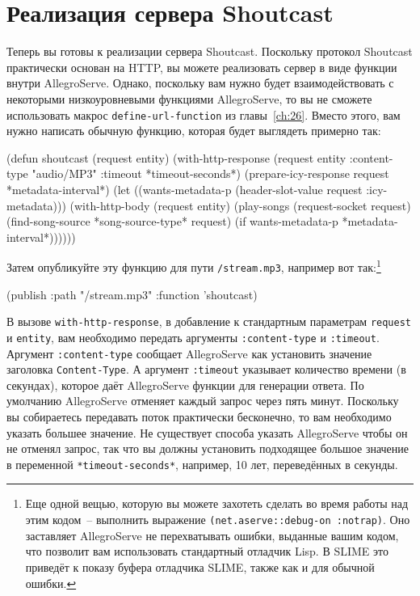 \section{Реализация сервера Shoutcast}

Теперь вы готовы к реализации сервера Shoutcast. Поскольку протокол Shoutcast практически
основан на HTTP, вы можете реализовать сервер в виде функции внутри AllegroServe.  Однако,
поскольку вам нужно будет взаимодействовать с некоторыми низкоуровневыми функциями
AllegroServe, то вы не сможете использовать макрос \lstinline{define-url-function} из
главы~\ref{ch:26}. Вместо этого, вам нужно написать обычную функцию, которая будет
выглядеть примерно так:

\begin{myverb}
(defun shoutcast (request entity)
  (with-http-response
      (request entity :content-type "audio/MP3" :timeout *timeout-seconds*)
    (prepare-icy-response request *metadata-interval*)
    (let ((wants-metadata-p (header-slot-value request :icy-metadata)))
      (with-http-body (request entity)
        (play-songs 
         (request-socket request)
         (find-song-source *song-source-type* request)
         (if wants-metadata-p *metadata-interval*))))))
\end{myverb}

Затем опубликуйте эту функцию для пути \lstinline{/stream.mp3}, например вот так:\footnote{Еще
  одной вещью, которую вы можете захотеть сделать во время работы над этим кодом~--
  выполнить выражение \lstinline{(net.aserve::debug-on :notrap)}.  Оно заставляет AllegroServe
  не перехватывать ошибки, выданные вашим кодом, что позволит вам использовать стандартный
  отладчик Lisp.  В SLIME это приведёт к показу буфера отладчика SLIME, также как и для
  обычной ошибки.}

\begin{myverb}
(publish :path "/stream.mp3" :function 'shoutcast)
\end{myverb}

В вызове \lstinline{with-http-response}, в добавление к стандартным параметрам \lstinline{request} и
\lstinline{entity}, вам необходимо передать аргументы \lstinline{:content-type} и \lstinline{:timeout}.
Аргумент \lstinline{:content-type} сообщает AllegroServe как установить значение заголовка
\lstinline{Content-Type}.  А аргумент \lstinline{:timeout} указывает количество времени (в
секундах), которое даёт AllegroServe функции для генерации ответа. По умолчанию
AllegroServe отменяет каждый запрос через пять минут.  Поскольку вы собираетесь передавать
поток практически бесконечно, то вам необходимо указать большее значение.  Не существует
способа указать AllegroServe чтобы он не отменял запрос, так что вы должны установить
подходящее большое значение в переменной \lstinline{*timeout-seconds*}, например, 10 лет,
переведённых в секунды.

